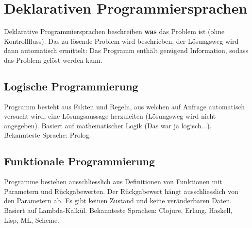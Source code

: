 \section{Deklarativen Programmiersprachen}

Deklarative Programmiersprachen beschreiben \textbf{was} das Problem ist (ohne Kontrollfluss). Das zu lösende Problem wird beschrieben, der Lösungsweg wird dann automatisch ermittelt: Das Programm enthält genügend Information, sodass das Problem gelöst werden kann.

\subsection{Logische Programmierung}

Programm besteht aus Fakten und Regeln, aus welchen auf Anfrage automatisch versucht wird, eine Lösungsaussage herzuleiten (Lösungsweg wird nicht angegeben). Basiert auf mathematischer Logik (Das war ja logisch...). Bekannteste Sprache: Prolog.

\subsection{Funktionale Programmierung}

Programme bestehen ausschliesslich aus Definitionen von Funktionen mit Parametern und Rückgabewerten. Der Rückgabewert hängt ausschliesslich von den Parametern ab. Es gibt keinen Zustand und keine veränderbaren Daten. Basiert auf Lambda-Kalkül. Bekannteste Sprachen: Clojure, Erlang, Haskell, Lisp, ML, Scheme.